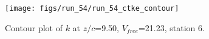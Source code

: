 \begin{figure}[H]
\centering
\texttt{[image: figs/run\_54/run\_54\_ctke\_contour]}
\caption{Contour plot of $k$ at $z/c$=9.50, $V_{free}$=21.23, station 6.}
\label{fig:run_54_ctke_contour}
\end{figure}


